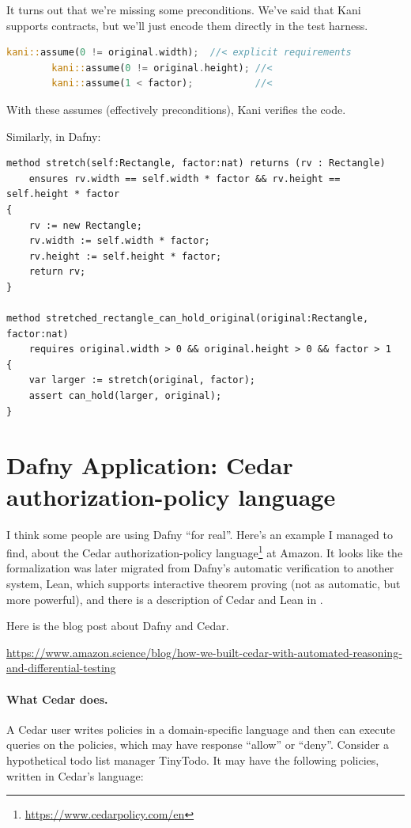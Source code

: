 \documentclass[11pt]{article}
\begin{document}
It turns out that we're missing some preconditions. We've said that Kani supports
contracts, but we'll just encode them
directly in the test harness.

\begin{lstlisting}[language=Rust]
        kani::assume(0 != original.width);  //< explicit requirements
        kani::assume(0 != original.height); //<
        kani::assume(1 < factor);           //<
\end{lstlisting}

With these \textsf{assume}s (effectively preconditions), Kani verifies the code.

Similarly, in Dafny:
\begin{lstlisting}[language=dafny]
method stretch(self:Rectangle, factor:nat) returns (rv : Rectangle)
    ensures rv.width == self.width * factor && rv.height == self.height * factor
{
    rv := new Rectangle;
    rv.width := self.width * factor;
    rv.height := self.height * factor;
    return rv;
}

method stretched_rectangle_can_hold_original(original:Rectangle, factor:nat)
    requires original.width > 0 && original.height > 0 && factor > 1
{
    var larger := stretch(original, factor);
    assert can_hold(larger, original);
}
\end{lstlisting}


\section*{Dafny Application: Cedar authorization-policy language}

I think some people are using Dafny ``for real''. Here's an example I managed to find,
about the Cedar authorization-policy language\footnote{\url{https://www.cedarpolicy.com/en}} at Amazon. It looks like the formalization
was later migrated from Dafny's automatic verification to another system, Lean, which
supports interactive theorem proving (not as automatic, but more powerful), and there
is a description of Cedar and Lean in \cite{cutler24:_cedar}.

Here is the blog post about Dafny and Cedar.
\begin{center}
\scriptsize \url{https://www.amazon.science/blog/how-we-built-cedar-with-automated-reasoning-and-differential-testing}
\end{center}

\paragraph{What Cedar does.} A Cedar user writes policies in a domain-specific language
and then can execute queries on the policies, which may have response ``allow'' or ``deny''.
Consider a hypothetical todo list manager TinyTodo. It may have the following policies, written
in Cedar's language:
\end{document}
